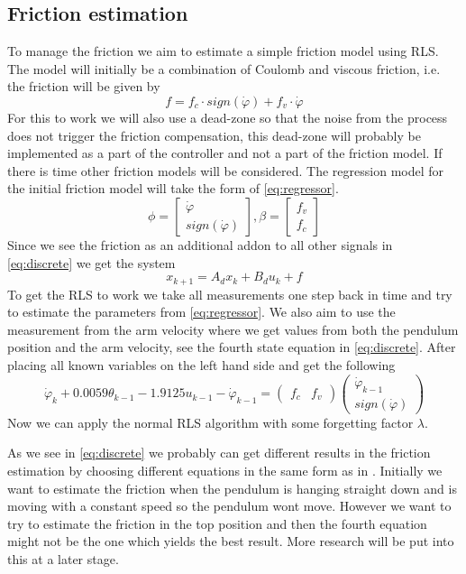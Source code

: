 \documentclass[10pt,a4paper]{article}
\begin{document}
\subsection{Friction estimation}
\label{sec:fricEst}
To manage the friction we aim to estimate a simple friction model using RLS. The model will initially be a combination of Coulomb and viscous friction, i.e. the friction will be given by $$f=f_c\cdot sign(\dot{\varphi})+f_v\cdot \dot{\varphi}$$
For this to work we will also use a dead-zone so that the noise from the process does not trigger the friction compensation, this dead-zone will probably be implemented as a part of the controller and not a part of the friction model. If there is time other friction models will be considered.
The regression model for the initial friction model will take the form of \ref{eq:regressor}.
\begin{equation}
\phi=\begin{bmatrix}
\dot{\varphi} \\
sign(\dot{\varphi})
\end{bmatrix}, \beta = \begin{bmatrix}
f_v\\
f_c
\end{bmatrix}
\label{eq:regressor}
\end{equation}
Since we see the friction as an additional addon to all other signals in \ref{eq:discrete} we get the system
$$x_{k+1} = A_dx_k + B_du_k + f$$
To get the RLS to work we take all measurements one step back in time and try to estimate the parameters from \ref{eq:regressor}. We also aim to use the measurement from the arm velocity where we get values from both the pendulum position and the arm velocity, see the fourth state equation in \ref{eq:discrete}. After placing all known variables on the left hand side and get the following
\begin{equation}
\dot{\varphi}_k + 0.0059\theta_{k-1}-1.9125u_{k-1}-\dot{\varphi}_{k-1} = \begin{pmatrix}
f_c & f_v
\end{pmatrix}\begin{pmatrix}
\dot{\varphi}_{k-1}\\
sign(\dot{\varphi})
\end{pmatrix}
\label{eq:estim}
\end{equation}
Now we can apply the normal RLS algorithm with some forgetting factor $\lambda$.

As we see in \ref{eq:discrete} we probably can get different results in the friction estimation by choosing different equations in the same form as in \label{eq:estim}. Initially we want to estimate the friction when the pendulum is hanging straight down and is moving with a constant speed so the pendulum wont move. However we want to try to estimate the friction in the top position and then the fourth equation might not be the one which yields the best result. More research will be put into this at a later stage.
\end{document}
